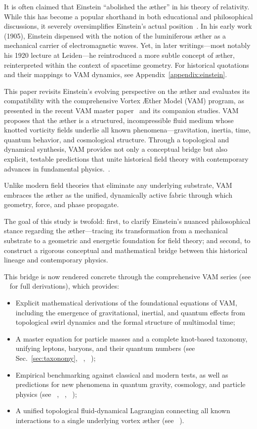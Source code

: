It is often claimed that Einstein ``abolished the æther'' in his theory of relativity. While this has become a popular shorthand in both educational and philosophical discussions, it severely oversimplifies Einstein's actual position~\cite{einstein1920aether}. In his early work (1905), Einstein dispensed with the notion of the luminiferous æther as a mechanical carrier of electromagnetic waves. Yet, in later writings—most notably his 1920 lecture at Leiden—he reintroduced a more subtle concept of æther, reinterpreted within the context of spacetime geometry.
For historical quotations and their mappings to VAM dynamics, see Appendix~\ref{appendix:einstein}.


This paper revisits Einstein’s evolving perspective on the æther and evaluates its compatibility with the comprehensive Vortex Æther Model (VAM) program, as presented in the recent VAM master paper~\cite{VAM-8} and its companion studies. VAM proposes that the æther is a structured, incompressible fluid medium whose knotted vorticity fields underlie all known phenomena—gravitation, inertia, time, quantum behavior, and cosmological structure. Through a topological and dynamical synthesis, VAM provides not only a conceptual bridge but also explicit, testable predictions that unite historical field theory with contemporary advances in fundamental physics.~\cite{VAM-11, VAM-15}.

Unlike modern field theories that eliminate any underlying substrate, VAM embraces the æther as the unified, dynamically active fabric through which geometry, force, and phase propagate.

The goal of this study is twofold: first, to clarify Einstein’s nuanced philosophical stance regarding the æther—tracing its transformation from a mechanical substrate to a geometric and energetic foundation for field theory; and second, to construct a rigorous conceptual and mathematical bridge between this historical lineage and contemporary physics.

This bridge is now rendered concrete through the comprehensive VAM series (see ~\cite{VAM-8} for full derivations), which provides:

\begin{itemize}
    \item Explicit mathematical derivations of the foundational equations of VAM, including the emergence of gravitational, inertial, and quantum effects from topological swirl dynamics and the formal structure of multimodal time;
    \item A master equation for particle masses and a complete knot-based taxonomy, unifying leptons, baryons, and their quantum numbers (see Sec.~\ref{sec:taxonomy}, ~\cite{VAM-8}, ~\cite{VAM-11});
    \item Empirical benchmarking against classical and modern tests, as well as predictions for new phenomena in quantum gravity, cosmology, and particle physics (see ~\cite{VAM-8}, ~\cite{VAM-12}, ~\cite{VAM-15});
    \item A unified topological fluid-dynamical Lagrangian connecting all known interactions to a single underlying vortex æther (see ~\cite{VAM-14}).
\end{itemize}

